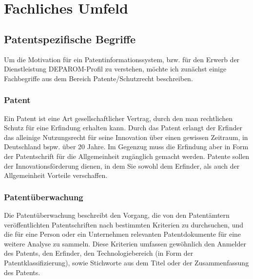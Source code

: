 
\chapter{Fachliches Umfeld} %

\label{ch:fachlichesUmfeld} %

\section{Patentspezifische Begriffe}
\label{ch:fachlichesUmfeld:PatentspezifischeBegriffe}

Um die Motivation für ein Patentinformationssystem, bzw. für den Erwerb der
Dienstleistung DEPAROM-Profil zu verstehen, möchte ich zunächst einige
Fachbegriffe aus dem Bereich Patente/Schutzrecht beschreiben.

\subsection{Patent}
\label{ch:fachlichesUmfeld:PatentspezifischeBegriffe:Patent}

Ein Patent ist eine Art gesellschaftlicher Vertrag, durch den man rechtlichen
Schutz für eine Erfindung erhalten kann. Durch das Patent erlangt der Erfinder
das alleinige Nutzungsrecht für seine Innovation über einen gewissen Zeitraum,
in Deutschland bspw. über 20 Jahre. \cite{patent} Im Gegenzug muss die Erfindung
aber in Form der Patentschrift für die Allgemeinheit zugänglich gemacht werden.
Patente sollen der Innovationsförderung dienen, in dem Sie sowohl dem Erfinder,
als auch der Allgemeinheit Vorteile verschaffen.

\subsection{Patentüberwachung}
\label{ch:fachlichesUmfeld:PatentspezifischeBegriffe:Patentueberwachung}

Die Patentüberwachung beschreibt den Vorgang, die von den Patentämtern
veröffentlichten Patentschriften nach bestimmten Kriterien zu durchsuchen, und
die für eine Person oder ein Unternehmen relevanten Patentdokumente für eine
weitere Analyse zu sammeln. Diese Kriterien umfassen gewöhnlich den Anmelder des
Patents, den Erfinder, den Technologiebereich (in Form der
Patentklassifizierung), sowie Stichworte aus dem Titel oder der Zusammenfassung
des Patents.

